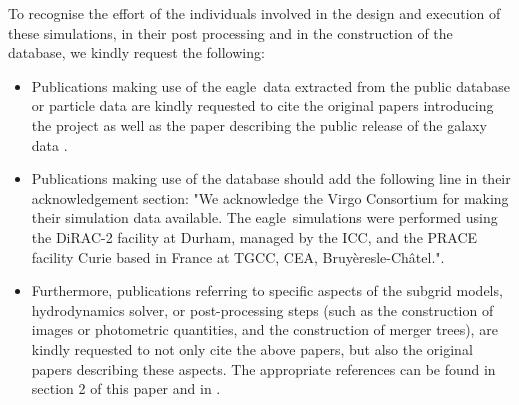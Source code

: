 \documentclass[10pt, a4paper]{article}
\newcommand{\eagle}{{\sc eagle}}
\begin{document}
To recognise the effort of the individuals involved in the design and execution
of these simulations, in their post processing and in the construction of the
database, we kindly request the following:

\begin{itemize}
\item Publications making use of the \eagle\ data extracted from the public
database or particle data are kindly requested to cite the original papers
introducing the project \cite{schaye2015,crain2015} as well as the paper
describing the public release of the galaxy data \cite{mcalpine2016}.
\item Publications making use of the database should add the following line in
their acknowledgement section: "We acknowledge the Virgo Consortium for making
their simulation data available. The \eagle\ simulations were performed using
the DiRAC-2 facility at Durham, managed by the ICC, and the PRACE facility
Curie based in France at TGCC, CEA, Bruy\`eresle-Ch\^atel.".
\item Furthermore, publications referring to specific aspects of the subgrid
models, hydrodynamics solver, or post-processing steps (such as the
construction of images or photometric quantities, and the construction of
merger trees), are kindly requested to not only cite the above papers, but also
the original papers describing these aspects. The appropriate references can be
found in section 2 of this paper and in \cite{schaye2015}.
\end{itemize}

\newpage


\end{document}
